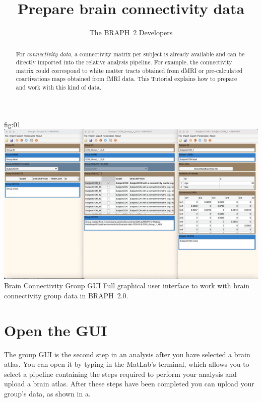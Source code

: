 \documentclass[justified]{tufte-handout}
\title{Prepare brain connectivity data}
\author[The BRAPH~2 Developers]{The BRAPH~2 Developers}
\begin{document}
\maketitle

\begin{abstract}
\noindent
For \emph{connectivity data}, a connectivity matrix per subject is already available and can be directly imported into the relative analysis pipeline. For example, the connectivity matrix could correspond to white matter tracts obtained from dMRI or pre-calculated coactivations maps obtained from fMRI data.
This Tutorial explains how to prepare and work with this kind of data.
\end{abstract}

\tableofcontents

	{fig:01}
	{\includegraphics{fig01.png}}
	{Brain Connectivity Group GUI}
	{
	Full graphical user interface to work with brain connectivity group data in BRAPH~2.0. 
	}

\clearpage
\section{Open the GUI}

The group GUI is the second step in an analysis after you have selected a brain atlas. You can open it by typing  in the MatLab's terminal, which allows you to select a pipeline containing the steps required to perform your analysis and upload a brain atlas. After these steps have been completed you can upload your group's data, as shown in a.
\end{document}
